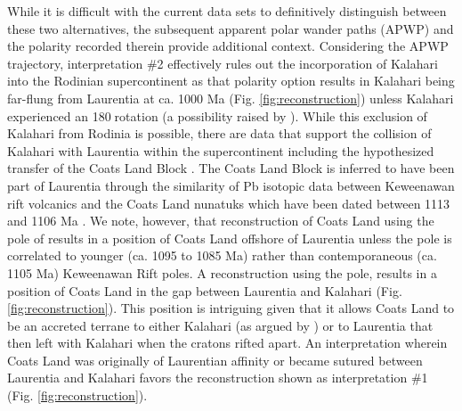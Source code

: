 \documentclass[11pt,letterpaper]{article}
\begin{document}
While it is difficult with the current data sets to definitively distinguish between these two alternatives, the subsequent apparent polar wander paths (APWP) and the polarity recorded therein provide additional context. Considering the APWP trajectory, interpretation $\#$2 effectively rules out the incorporation of Kalahari into the Rodinian supercontinent as that polarity option results in Kalahari being far-flung from Laurentia at ca. 1000 Ma (Fig. \ref{fig:reconstruction}) unless Kalahari experienced an 180\textdegree$\;$rotation (a possibility raised by \citealt{Jacobs2008a}). While this exclusion of Kalahari from Rodinia is possible, there are data that support the collision of Kalahari with Laurentia within the supercontinent including the hypothesized transfer of the Coats Land Block \citep{Loewy2011a}. The Coats Land Block is inferred to have been part of Laurentia through the similarity of Pb isotopic data between Keweenawan rift volcanics and the Coats Land nunatuks \citep{Loewy2011a} which have been dated between 1113 and 1106 Ma \citep{Gose1997a}. We note, however, that reconstruction of Coats Land using the pole of \cite{Gose1997a} results in a position of Coats Land offshore of Laurentia unless the pole is correlated to younger (ca. 1095 to 1085 Ma) rather than contemporaneous (ca. 1105 Ma) Keweenawan Rift poles. A reconstruction using the \cite{Gose1997a} pole, results in a position of Coats Land in the gap between Laurentia and Kalahari (Fig. \ref{fig:reconstruction}). This position is intriguing given that it allows Coats Land to be an accreted terrane to either Kalahari (as argued by \cite{Dalziel2000a}) or to Laurentia that then left with Kalahari when the cratons rifted apart. An interpretation wherein Coats Land was originally of Laurentian affinity or became sutured between Laurentia and Kalahari favors the reconstruction shown as interpretation $\#$1 (Fig. \ref{fig:reconstruction}).
\end{document}
